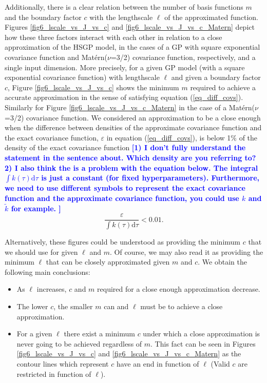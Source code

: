 \documentclass[onecolumn,a4paper,11pt]{article}
\newcommand{\todo}[1]{\textcolor{blue}{\textbf{[#1]}}}
\begin{document}
Additionally, there is a clear relation between the number of basis functions $m$ and the boundary factor $c$ with the lengthscale $\ell$ of the approximated function. Figures \ref{fig6_lscale_vs_J_vs_c} and \ref{fig6_lscale_vs_J_vs_c_Matern} depict how these three factors interact with each other in relation to a close approximation of the HSGP model, in the cases of a GP with square exponential covariance function and Mat\'ern($\nu$=3/2) covariance function, respectively, and a single input dimension. More precisely, for a given GP model (with a square exponential covariance function) with lengthscale $\ell$ and given a boundary factor $c$, Figure \ref{fig6_lscale_vs_J_vs_c} shows the minimum $m$ required to achieve a accurate approximation in the sense of satisfying equation (\ref{eq_diff_covs}). Similarly for Figure \ref{fig6_lscale_vs_J_vs_c_Matern} in the case of a Mat\'ern($\nu$=3/2) covariance function. We considered an approximation to be a close enough when the difference between densities of the approximate covariance function and the exact covariance function, $\varepsilon$ in equation (\ref{eq_diff_covs}), is below 1$\%$ of the density of the exact covariance function
\todo{1) I don't fully understand the statement in the sentence about. Which density are you referring to? 2) I also think the is a problem with the equation below. The integral $\int k(\tau) \mathrm{d}\tau$ is just a constant (for fixed hyperparameters). Furthermore, we need to use different symbols to represent the exact covariance function and the approximate covariance function, you could use $k$ and $\tilde{k}$ for example. }
%
\begin{equation*}
 \frac{\varepsilon}{\int k(\tau) \mathrm{d}\tau} < 0.01.
\end{equation*}


\noindent Alternatively, these figures could be understood as providing the minimum $c$ that we should use for given $\ell$ and $m$. Of course, we may also read it as providing the minimum $\ell$ that can be closely approximated given $m$ and $c$. We obtain the following main conclusions:

\begin{itemize}
\item As $\ell$ increases, $c$ and $m$ required for a close enough approximation decrease.
\item The lower $c$, the smaller $m$ can and $\ell$ must be to achieve a close approximation.
\item For a given $\ell$ there exist a minimum $c$ under which a close approximation is never going to be achieved regardless of $m$. This fact can be seen in Figures \ref{fig6_lscale_vs_J_vs_c} and \ref{fig6_lscale_vs_J_vs_c_Matern} as the contour lines which represent $c$ have an end in function of $\ell$ (Valid $c$ are restricted in function of $\ell$).
\end{itemize}
\end{document}
